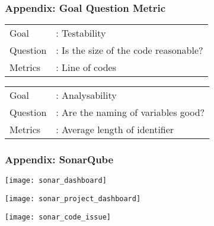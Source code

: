 \begin{frame}
\label{appendix:goal_question_metric}
\frametitle{Appendix: Goal Question Metric}

\begin{example}
\begin{tabular}{ l l }
Goal &: Testability \\
Question &: Is the size of the code reasonable? \\
Metrics &: Line of codes\\
\end{tabular}
\end{example}

\begin{example}
\begin{tabular}{ l l }
Goal &: Analysability \\
Question &: Are the naming of variables good? \\
Metrics &: Average length of identifier\\
\end{tabular}
\end{example}

\hyperlink{subsection:goal_question_metric}{}

\end{frame}

\begin{frame}[allowframebreaks]
\label{appendix:sonar_qube}
\frametitle{Appendix: SonarQube}

\begin{center}
\texttt{[image: sonar\_dashboard]}
\end{center}
\hyperlink{subsection:sonar_qube}{}

\framebreak

\begin{center}
\texttt{[image: sonar\_project\_dashboard]}
\end{center}

\hyperlink{subsection:sonar_qube}{}

\framebreak

\begin{center}
\texttt{[image: sonar\_code\_issue]}
\end{center}

\hyperlink{subsection:sonar_qube}{}
\end{frame}